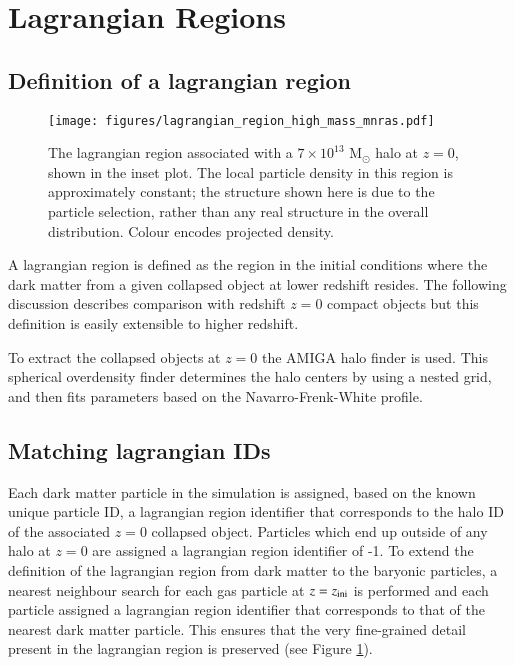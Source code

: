 \section{Lagrangian Regions}
\label{sec:lagrangianregions}

\subsection{Definition of a lagrangian region}

\begin{figure}
    \centering
    \texttt{[image: figures/lagrangian\_region\_high\_mass\_mnras.pdf]}
    \caption{The lagrangian region associated with a $7\times10^{13}$
	$\mathrm{M}_\odot$ halo at $z=0$, shown in the inset plot. The local
	particle density in this region is approximately constant; the
	structure shown here is due to the particle selection, rather than any
	real structure in the overall distribution. Colour encodes projected
	density.}
    \label{fig:lrpic}
\end{figure}

A lagrangian region is defined as the region in the initial conditions where
the dark matter from a given collapsed object at lower redshift resides. The
following discussion describes comparison with redshift $z=0$ compact objects
but this definition is easily extensible to higher redshift.

To extract the collapsed objects at $z=0$ the AMIGA halo finder
\citep[AHF,][]{ahfi, ahfii} is used. This spherical overdensity finder
determines the halo centers by using a nested grid, and then fits parameters
based on the Navarro-Frenk-White \citep[NFW, ][]{nfw} profile.

\subsection{Matching lagrangian IDs}

Each dark matter particle in the simulation is assigned, based on the known
unique particle ID, a lagrangian region identifier that corresponds to the halo
ID of the associated $z=0$ collapsed object. Particles which end up outside of
any halo at $z=0$ are assigned a lagrangian region identifier of -1. 
To extend the definition of the lagrangian region from dark matter to the
baryonic particles, a nearest neighbour search for each gas
particle at $z=z_{\rm ini}$ is performed and each particle assigned a
lagrangian region identifier that corresponds to that of the nearest dark
matter particle. This ensures that the very fine-grained detail present in the
lagrangian region is preserved (see Figure \ref{fig:lrpic}).

